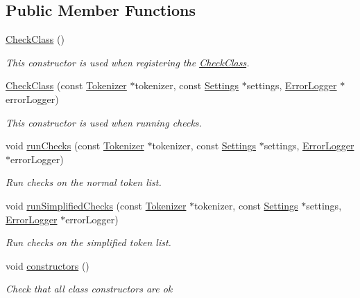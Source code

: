 \subsection*{Public Member Functions}
\begin{DoxyCompactItemize}
\item 
\hyperlink{class_check_class_a5697469cc2dacac5c59a51f7f778350a}{Check\-Class} ()
\begin{DoxyCompactList}\small\item\em This constructor is used when registering the \hyperlink{class_check_class}{Check\-Class}. \end{DoxyCompactList}\item 
\hyperlink{class_check_class_a226c3e395779861ddfff8fdd7e718a01}{Check\-Class} (const \hyperlink{class_tokenizer}{Tokenizer} $\ast$tokenizer, const \hyperlink{class_settings}{Settings} $\ast$settings, \hyperlink{class_error_logger}{Error\-Logger} $\ast$error\-Logger)
\begin{DoxyCompactList}\small\item\em This constructor is used when running checks. \end{DoxyCompactList}\item 
void \hyperlink{class_check_class_a4b859971ef62ebe705f7561fa3e97726}{run\-Checks} (const \hyperlink{class_tokenizer}{Tokenizer} $\ast$tokenizer, const \hyperlink{class_settings}{Settings} $\ast$settings, \hyperlink{class_error_logger}{Error\-Logger} $\ast$error\-Logger)
\begin{DoxyCompactList}\small\item\em Run checks on the normal token list. \end{DoxyCompactList}\item 
void \hyperlink{class_check_class_a2e24ebc1b57dc616cbccb1edda79cb27}{run\-Simplified\-Checks} (const \hyperlink{class_tokenizer}{Tokenizer} $\ast$tokenizer, const \hyperlink{class_settings}{Settings} $\ast$settings, \hyperlink{class_error_logger}{Error\-Logger} $\ast$error\-Logger)
\begin{DoxyCompactList}\small\item\em Run checks on the simplified token list. \end{DoxyCompactList}\item 
void \hyperlink{class_check_class_ab1c5f13f64c9876aec84207899d7fc89}{constructors} ()
\begin{DoxyCompactList}\small\item\em Check that all class constructors are ok \end{DoxyCompactList}\item 

\end{DoxyCompactItemize}
